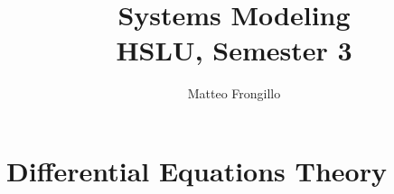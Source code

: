 \documentclass{article}
\title{\textbf{Systems Modeling \\ HSLU, Semester 3}}
\author{Matteo Frongillo}
\date{}
\begin{document}
\maketitle
\tableofcontents
\pagebreak

\part{Differential Equations Theory}
\end{document}
